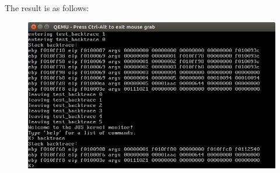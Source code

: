 The result is as follows:
\begin{figure}[H]
  \centering
  \includegraphics[width=0.8\linewidth]{figure/backtrace_result}
\end{figure}
\clearpage





























